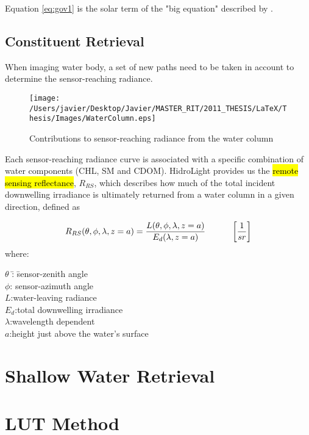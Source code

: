 Equation \eqref{eq:gov1} is the solar term of the "big equation" described by \cite{Schott}.

\subsection{Constituent Retrieval}

When imaging water body, a set of new paths need to be taken in account to determine the sensor-reaching radiance.
 \begin{figure}[H]
	\centering
    	\texttt{[image: /Users/javier/Desktop/Javier/MASTER\_RIT/2011\_THESIS/LaTeX/Thesis/Images/WaterColumn.eps]}
 	\caption{Contributions to sensor-reaching radiance from the water column \label{fig:WaterColumn}}
  \end{figure}


Each sensor-reaching radiance curve is associated with a specific combination of water components (CHL, SM and CDOM). HidroLight provides us the \hl{remote sensing reflectance}, $R_{RS}$, which describes how much of the total incident downwelling irradiance is ultimately returned from a water column in a given direction, defined as

\begin{equation} \label{eq:Rrs}
R_{RS}(\theta,\phi,\lambda,z=a) = \frac{L(\theta,\phi,\lambda,z=a)}{E_d(\lambda,z=a)}   \indent   \indent  \left[\frac{1}{sr}\right]  
\end{equation} 
where:
\begin{tabbing}
\indent \indent \indent  $\theta$ \hspace{1.5mm}\=:  \indent \= sensor-zenith angle\\
\indent \indent \indent  $\phi$\>: \>sensor-azimuth angle\\
\indent \indent \indent $L$\>:\>water-leaving radiance\\
\indent \indent \indent $E_d$\>:\>total downwelling irradiance\\
\indent \indent \indent $\lambda$\>:\>wavelength dependent\\
\indent \indent \indent $a$\>:\>height just above the water's surface\\
\end{tabbing}



\section{Shallow Water Retrieval}
\section{LUT Method}
